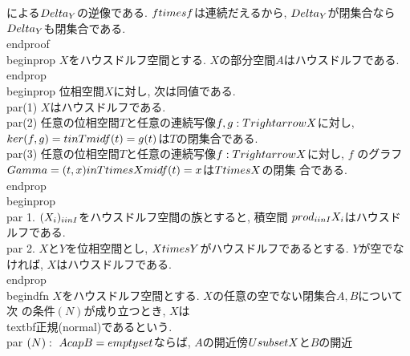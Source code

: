  による$\\Delta_{Y}$の逆像である. $f\\times f$は連続だえるから,
 $\\Delta_{Y}$が閉集合なら$\\Delta_{Y}$も閉集合である.
\\end{proof}
\\begin{prop}
 $X$をハウスドルフ空間とする. $X$の部分空間$A$はハウスドルフである.
\\end{prop}
\\begin{prop}
 位相空間$X$に対し, 次は同値である.
 \\par(1) $X$はハウスドルフである.
 \\par(2) 任意の位相空間$T$と任意の連続写像$f, g:T\\rightarrow X$に対し,
 $\\ker(f, g)=\\{t\\in T\\mid f(t)=g(t)\\}$は$T$の閉集合である.
 \\par(3) 任意の位相空間$T$と任意の連続写像$f:T\\rightarrow X$に対し, $f$
 のグラフ$\\Gamma=\\{(t, x)\\in T\\times X\\mid f(t)=x\\}$は$T\\times X$の閉集
 合である.
\\end{prop}
\\begin{prop}
 \\par 1. $(X_{i})_{i\\in I}$をハウスドルフ空間の族とすると, 積空間
 $\\prod_{i\\in I}X_{i}$はハウスドルフである.
 \\par 2. $X$と$Y$を位相空間とし, $X\\times Y$がハウスドルフであるとする.
 $Y$が空でなければ, $X$はハウスドルフである.
\\end{prop}
\\begin{dfn}
 $X$をハウスドルフ空間とする. $X$の任意の空でない閉集合$A, B$について次
 の条件$(N)$が成り立つとき, $X$は\\textbf{正規}(normal)であるという.
 \\par $(N):~A\\cap B=\\emptyset$ならば, $A$の開近傍$U\\subset X$と$B$の開近
